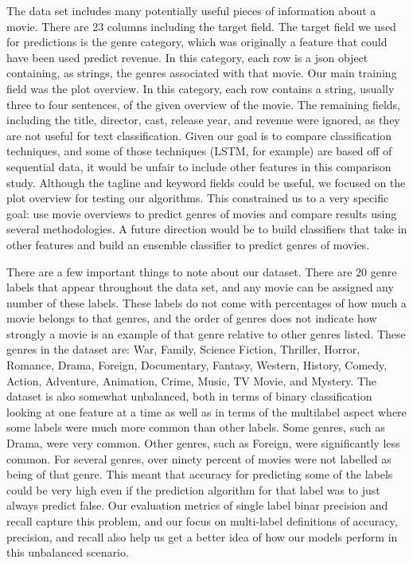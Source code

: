 \documentclass[sigconf]{acmart}
\begin{document}
The data set includes many potentially useful pieces of information about a movie. There are 23 columns including the target field. The target field we used for predictions is the genre category, which was originally a feature that could have been used predict revenue. In this category, each row is a json object containing, as strings, the genres associated with that movie. Our main training field was the plot overview. In this category, each row contains a string, usually three to four sentences, of the given overview of the movie. The remaining fields, including the title, director, cast, release year, and revenue were ignored, as they are not useful for text classification. Given our goal is to compare classification techniques, and some of those techniques (LSTM, for example) are based off of sequential data, it would be unfair to include other features in this comparison study. Although the tagline and keyword fields could be useful, we focused on the plot overview for testing our algorithms. This constrained us to a very specific goal: use movie overviews to predict genres of movies and compare results using several methodologies. A future direction would be to build classifiers that take in other features and build an ensemble classifier to predict genres of movies. 

There are a few important things to note about our dataset.  There are 20 genre labels that appear throughout the data set, and any movie can be assigned any number of these labels.  These labels do not come with percentages of how much a movie belongs to that genres, and the order of genres does not indicate how strongly a movie is an example of that genre relative to other genres listed.  These genres in the dataset are: War, Family, Science Fiction, Thriller, Horror, Romance, Drama, Foreign, Documentary, Fantasy, Western, History, Comedy, Action, Adventure, Animation, Crime, Music, TV Movie, and Mystery. The dataset is also somewhat unbalanced, both in terms of binary classification looking at one feature at a time as well as in terms of the multilabel aspect where some labels were much more common than other labels.  Some genres, such as Drama, were very common.  Other genres, such as Foreign, were significantly less common. For several genres, over ninety percent of movies were not labelled as being of that genre. This meant that accuracy for predicting some of the labels could be very high even if the prediction algorithm for that label was to just always predict false.  Our evaluation metrics of single label binar precision and recall capture this problem, and our focus on multi-label definitions of accuracy, precision, and recall also help us get a better idea of how our models perform in this unbalanced scenario. 
\end{document}
